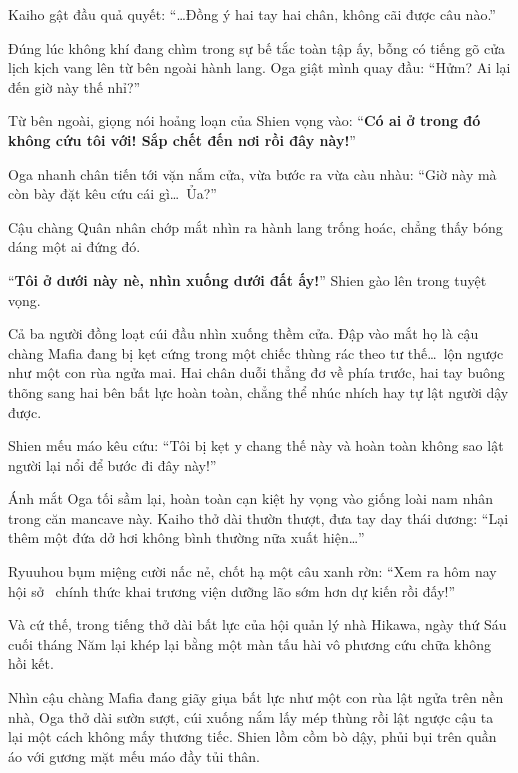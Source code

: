 \documentclass[../main.tex]{subfiles}
\begin{document}
Kaiho gật đầu quả quyết: ``\dots Đồng ý hai tay hai chân, không cãi được câu nào.''

Đúng lúc không khí đang chìm trong sự bế tắc toàn tập ấy, bỗng có tiếng gõ cửa lịch kịch vang lên từ bên ngoài hành lang. Oga giật mình quay đầu: ``Hửm? Ai lại đến giờ này thế nhỉ?''

Từ bên ngoài, giọng nói hoảng loạn của Shien vọng vào: ``\textbf{Có ai ở trong đó không cứu tôi với! Sắp chết đến nơi rồi đây này!}''

Oga nhanh chân tiến tới vặn nắm cửa, vừa bước ra vừa càu nhàu: ``Giờ này mà còn bày đặt kêu cứu cái gì\dots\ Ủa?''

Cậu chàng Quân nhân chớp mắt nhìn ra hành lang trống hoác, chẳng thấy bóng dáng một ai đứng đó.

``\textbf{Tôi ở dưới này nè, nhìn xuống dưới đất ấy!}'' Shien gào lên trong tuyệt vọng.

Cả ba người đồng loạt cúi đầu nhìn xuống thềm cửa. Đập vào mắt họ là cậu chàng Mafia đang bị kẹt cứng trong một chiếc thùng rác theo tư thế\dots\ lộn ngược như một con rùa ngửa mai. Hai chân duỗi thẳng đơ về phía trước, hai tay buông thõng sang hai bên bất lực hoàn toàn, chẳng thể nhúc nhích hay tự lật người dậy được.


Shien mếu máo kêu cứu: ``Tôi bị kẹt y chang thế này và hoàn toàn không sao lật người lại nổi để bước đi đây này!''

Ánh mắt Oga tối sầm lại, hoàn toàn cạn kiệt hy vọng vào giống loài nam nhân trong căn mancave này. Kaiho thở dài thườn thượt, đưa tay day thái dương: ``Lại thêm một đứa dở hơi không bình thường nữa xuất hiện\dots''

Ryuuhou bụm miệng cười nấc nẻ, chốt hạ một câu xanh rờn: ``Xem ra hôm nay hội sở \hls\ chính thức khai trương viện dưỡng lão sớm hơn dự kiến rồi đấy!''

Và cứ thế, trong tiếng thở dài bất lực của hội quản lý nhà Hikawa, ngày thứ Sáu cuối tháng Năm lại khép lại bằng một màn tấu hài vô phương cứu chữa không hồi kết.

\omk

Nhìn cậu chàng Mafia đang giãy giụa bất lực như một con rùa lật ngửa trên nền nhà, Oga thở dài sườn sượt, cúi xuống nắm lấy mép thùng rồi lật ngược cậu ta lại một cách không mấy thương tiếc. Shien lồm cồm bò dậy, phủi bụi trên quần áo với gương mặt mếu máo đầy tủi thân.
\end{document}
